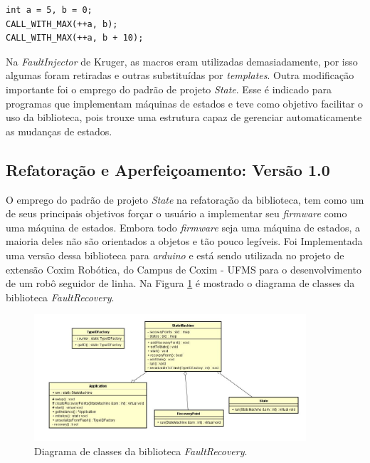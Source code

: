 \begin{lstlisting}[label=Func:MacroInvocacao,caption={[Macro sendo chamada no código] Na primeira invocação da macro a variável a é incrementada duas vezes e na segunda uma vez.}]
int a = 5, b = 0;
CALL_WITH_MAX(++a, b);
CALL_WITH_MAX(++a, b + 10);
\end{lstlisting}


Na \textit{FaultInjector} de Kruger, as macros eram utilizadas demasiadamente, por isso algumas foram retiradas e outras substituídas por \textit{templates}. Outra modificação importante foi o emprego do padrão de projeto \textit{State}. Esse é indicado para programas que implementam máquinas de estados e teve como objetivo facilitar o uso da biblioteca, pois trouxe uma estrutura capaz de gerenciar automaticamente as mudanças de estados.

\subsection{Refatoração e Aperfeiçoamento: Versão 1.0} \label{subsec:versao1}

O emprego do padrão de projeto \textit{State} na refatoração da biblioteca, tem como um de seus principais objetivos forçar o usuário a implementar seu \textit{firmware} como uma máquina de estados. Embora todo \textit{firmware} seja uma máquina de estados, a maioria deles não são orientados a objetos e tão pouco legíveis. Foi Implementada uma versão dessa biblioteca para \textit{arduino} e está sendo utilizada no projeto de extensão Coxim Robótica, do Campus de Coxim - UFMS para o desenvolvimento de um robô seguidor de linha. Na Figura \ref{Img:diagramaFaultRecovery} é mostrado o diagrama de classes da biblioteca \textit{FaultRecovery}.

\begin{figure}[H]
	\centering
	\includegraphics[width=0.9\textwidth]{figuras/diagramaFaultRecovery.jpg}
	\caption[Diagrama de classes da biblioteca \textit{FaultRecovery}.]{Diagrama de classes da biblioteca \textit{FaultRecovery}.}
	\label{Img:diagramaFaultRecovery}	
\end{figure}

